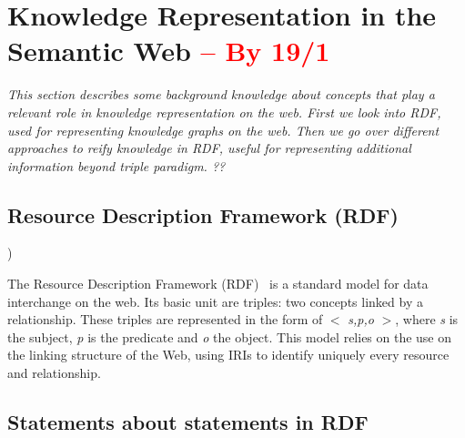 \section{Knowledge Representation in the Semantic Web \textcolor{red}{-- By 19/1}}
\label{sec:chp2_semweb}

\textit{This section describes some background knowledge about concepts that play a relevant role in knowledge representation on the web. First we look into RDF, used for representing knowledge graphs on the web. Then we go over different approaches to reify knowledge in RDF, useful for representing additional information beyond triple paradigm. ??}

\subsection{Resource Description Framework (RDF)}

)

The Resource Description Framework (RDF)~\parencite{rdf} is a standard model for data interchange on the web. Its basic unit are triples: two concepts linked by a relationship. These triples are represented in the form of $<$ \textit{s,p,o} $>$, where \textit{s} is the subject, \textit{p} is the predicate and \textit{o} the object. This model relies on the use on the linking structure of the Web, using IRIs to identify uniquely every resource and relationship. 

\subsection{Statements about statements in RDF}

